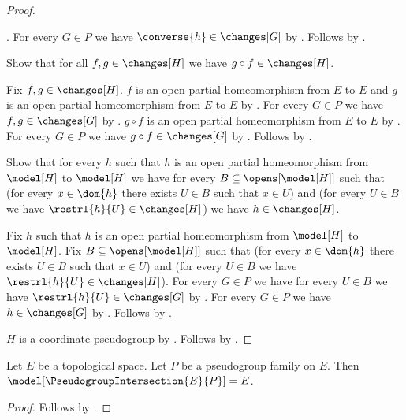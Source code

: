 \begin{proof}
\begin{subproof}
            .
        For every $G\in P$ we have $\converse{h}\in\changes[G]$ by
            .
        Follows by .
    \end{subproof}
    Show that for all $f,g\in\changes[H]$ we have $g\circ f\in\changes[H]$.
    \begin{subproof}
        Fix $f,g\in\changes[H]$.
        $f$ is an open partial homeomorphism from $E$ to $E$ and
            $g$ is an open partial homeomorphism from $E$ to $E$ by
            .
        For every $G\in P$ we have $f,g\in\changes[G]$ by
            .
        $g\circ f$ is an open partial homeomorphism from $E$ to $E$ by
            .
        For every $G\in P$ we have $g\circ f\in\changes[G]$ by
            .
        Follows by .
    \end{subproof}
    Show that for every $h$ such that $h$ is an open partial homeomorphism
        from $\model[H]$ to $\model[H]$ we have
        for every $B\subseteq\opens[\model[H]]$ such that
            (for every $x\in\dom{h}$ there exists $U\in B$ such that $x\in U$) and
            (for every $U\in B$ we have $\restrl{h}{U}\in\changes[H]$)
        we have $h\in\changes[H]$.
    \begin{subproof}
        Fix $h$ such that $h$ is an open partial homeomorphism
            from $\model[H]$ to $\model[H]$.
        Fix $B\subseteq\opens[\model[H]]$ such that
            (for every $x\in\dom{h}$ there exists $U\in B$ such that $x\in U$) and
            (for every $U\in B$ we have $\restrl{h}{U}\in\changes[H]$).
        For every $G\in P$ we have for every $U\in B$ we have
            $\restrl{h}{U}\in\changes[G]$ by .
        For every $G\in P$ we have $h\in\changes[G]$ by .
        Follows by .
    \end{subproof}
    $H$ is a coordinate pseudogroup by .
    Follows by .
\end{proof}

\begin{theorem}\label{pseudogroup_intersection_model}
    Let $E$ be a topological space.
    Let $P$ be a pseudogroup family on $E$.
    Then $\model[\PseudogroupIntersection{E}{P}]=E$.
\end{theorem}
\begin{proof}
    Follows by .
\end{proof}

